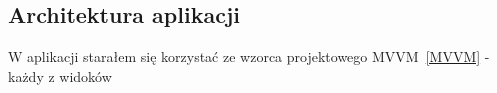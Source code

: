 \subsection{Architektura aplikacji}

W aplikacji starałem się korzystać ze wzorca projektowego MVVM~\ref{MVVM} - 
każdy z widoków 